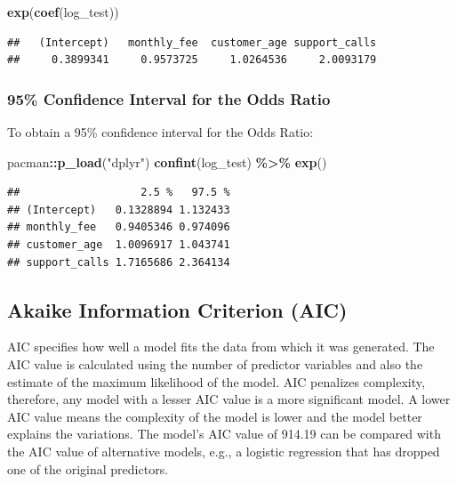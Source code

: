 \documentclass[
]{article}
\newenvironment{Shaded}{\begin{snugshade}}{\end{snugshade}}
\newcommand{\FunctionTok}[1]{\textcolor[rgb]{0.13,0.29,0.53}{\textbf{#1}}}
\newcommand{\NormalTok}[1]{#1}
\newcommand{\SpecialCharTok}[1]{\textcolor[rgb]{0.81,0.36,0.00}{\textbf{#1}}}
\newcommand{\StringTok}[1]{\textcolor[rgb]{0.31,0.60,0.02}{#1}}
\begin{document}
\begin{Shaded}
\begin{Highlighting}[]
\FunctionTok{exp}\NormalTok{(}\FunctionTok{coef}\NormalTok{(log\_test))}
\end{Highlighting}
\end{Shaded}

\begin{verbatim}
##   (Intercept)   monthly_fee  customer_age support_calls 
##     0.3899341     0.9573725     1.0264536     2.0093179
\end{verbatim}

\subsubsection{95\% Confidence Interval for the Odds
Ratio}\label{confidence-interval-for-the-odds-ratio}

To obtain a 95\% confidence interval for the Odds Ratio:

\begin{Shaded}
\begin{Highlighting}[]
\NormalTok{pacman}\SpecialCharTok{::}\FunctionTok{p\_load}\NormalTok{(}\StringTok{"dplyr"}\NormalTok{)}
\FunctionTok{confint}\NormalTok{(log\_test) }\SpecialCharTok{\%\textgreater{}\%} \FunctionTok{exp}\NormalTok{()}
\end{Highlighting}
\end{Shaded}

\begin{verbatim}
##                   2.5 %   97.5 %
## (Intercept)   0.1328894 1.132433
## monthly_fee   0.9405346 0.974096
## customer_age  1.0096917 1.043741
## support_calls 1.7165686 2.364134
\end{verbatim}

\subsection{Akaike Information Criterion
(AIC)}\label{akaike-information-criterion-aic}

AIC specifies how well a model fits the data from which it was
generated. The AIC value is calculated using the number of predictor
variables and also the estimate of the maximum likelihood of the model.
AIC penalizes complexity, therefore, any model with a lesser AIC value
is a more significant model. A lower AIC value means the complexity of
the model is lower and the model better explains the variations. The
model's AIC value of 914.19 can be compared with the AIC value of
alternative models, e.g., a logistic regression that has dropped one of
the original predictors.
\end{document}
